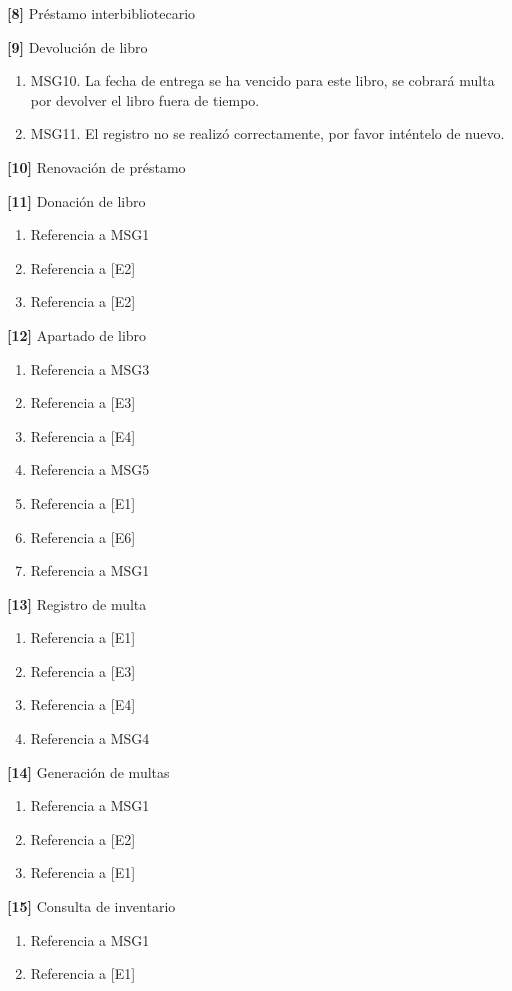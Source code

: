 \begin{Citemize}
\begin{enumerate}
		\end{enumerate}
	\item {\bf [8]} Préstamo interbibliotecario
	\item {\bf [9]} Devolución de libro
		\begin{enumerate}
			\item MSG10. La fecha de entrega se ha vencido para este libro, se cobrará multa por devolver el libro fuera de tiempo.
			\item MSG11. El registro no se realizó correctamente, por favor inténtelo de nuevo.
		\end{enumerate}
	\item {\bf [10]} Renovación de préstamo
	\item {\bf [11]} Donación de libro
		\begin{enumerate}
			\item Referencia a MSG1
			\item Referencia a [E2]
			\item Referencia a [E2]
		\end{enumerate}
	\item {\bf [12]} Apartado de libro
		\begin{enumerate}
			\item Referencia a MSG3
			\item Referencia a [E3]
			\item Referencia a [E4]
			\item Referencia a MSG5
			\item Referencia a [E1]
			\item Referencia a [E6]
			\item Referencia a MSG1
		\end{enumerate}
	\item {\bf [13]} Registro de multa
		\begin{enumerate}
			\item Referencia a [E1]
			\item Referencia a [E3]
			\item Referencia a [E4]
			\item Referencia a MSG4
		\end{enumerate}
	\item {\bf [14]} Generación de multas
		\begin{enumerate}
			\item Referencia a MSG1
			\item Referencia a [E2]
			\item Referencia a [E1]
		\end{enumerate}
	\item {\bf [15]} Consulta de inventario
		\begin{enumerate}
			\item Referencia a MSG1
			\item Referencia a [E1]
		\end{enumerate}
	\end{Citemize}
